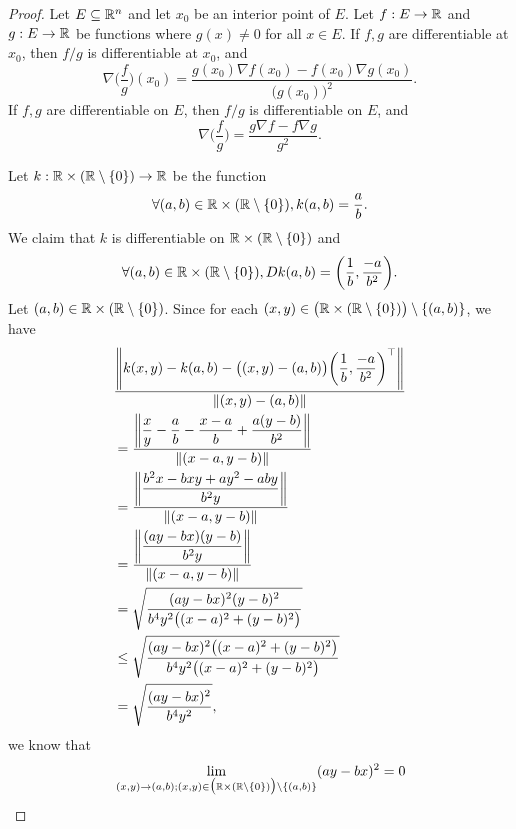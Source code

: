 \begin{proof}
  Let \(E \subseteq \R^n\) and let \(x_0\) be an interior point of \(E\).
  Let \(f : E \to \R\) and \(g : E \to \R\) be functions where \(g(x) \neq 0\) for all \(x \in E\).
  If \(f, g\) are differentiable at \(x_0\), then \(f / g\) is differentiable at \(x_0\), and
  \[
    \nabla \bigg(\dfrac{f}{g}\bigg)(x_0) = \dfrac{g(x_0) \nabla f(x_0) - f(x_0) \nabla g(x_0)}{\big(g(x_0)\big)^2}.
  \]
  If \(f, g\) are differentiable on \(E\), then \(f / g\) is differentiable on \(E\), and
  \[
    \nabla \bigg(\dfrac{f}{g}\bigg) = \dfrac{g \nabla f - f \nabla g}{g^2}.
  \]

  Let \(k : \R \times (\R \setminus \{0\}) \to \R\) be the function
  \[
    \forall (a, b) \in \R \times (\R \setminus \{0\}), k(a, b) = \dfrac{a}{b}.
  \]
  We claim that \(k\) is differentiable on \(\R \times (\R \setminus \{0\})\) and
  \[
    \forall (a, b) \in \R \times (\R \setminus \{0\}), D k(a, b) = \bigg(\dfrac{1}{b}, \dfrac{-a}{b^2}\bigg).
  \]
  Let \((a, b) \in \R \times (\R \setminus \{0\})\).
  Since for each \((x, y) \in \big(\R \times (\R \setminus \{0\})\big) \setminus \{(a, b)\}\), we have
  \begin{align*}
     & \dfrac{\norm*{k(x, y) - k(a, b) - \big((x, y) - (a, b)\big) \bigg(\dfrac{1}{b}, \dfrac{-a}{b^2}\bigg)^\top}}{\norm*{(x, y) - (a, b)}} \\
     & = \dfrac{\norm*{\dfrac{x}{y} - \dfrac{a}{b} - \dfrac{x - a}{b} + \dfrac{a(y - b)}{b^2}}}{\norm*{(x - a, y - b)}}                      \\
     & = \dfrac{\norm*{\dfrac{b^2 x - bxy + ay^2 - aby}{b^2y}}}{\norm*{(x - a, y - b)}}                                                      \\
     & = \dfrac{\norm*{\dfrac{(ay - bx)(y - b)}{b^2y}}}{\norm*{(x - a, y - b)}}                                                              \\
     & = \sqrt{\dfrac{(ay - bx)^2 (y - b)^2}{b^4 y^2 \big((x - a)^2 + (y - b)^2\big)}}                                                       \\
     & \leq \sqrt{\dfrac{(ay - bx)^2 \big((x - a)^2 + (y - b)^2\big)}{b^4 y^2 \big((x - a)^2 + (y - b)^2\big)}}                              \\
     & = \sqrt{\dfrac{(ay - bx)^2}{b^4 y^2}},
  \end{align*}
  we know that
  \begin{align*}
             & \lim_{(x, y) \to (a, b) ; (x, y) \in \big(\R \times (\R \setminus \{0\})\big) \setminus \{(a, b)\}} (ay - bx)^2 = 0                                                                                                                     \\

\end{align*}
\end{proof}
